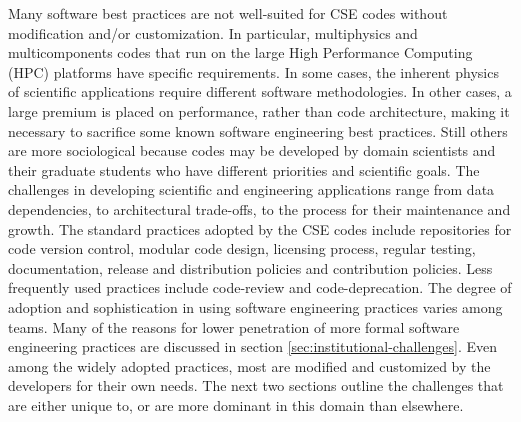 Many software best practices are not well-suited for CSE codes without
modification and/or customization.  In particular, multiphysics and
multicomponents codes that run on the large High Performance Computing
(HPC) platforms have specific requirements.  In some cases, the
inherent physics of scientific applications require different software
methodologies.  In other cases, a large premium is placed on
performance, rather than code architecture, making it necessary to
sacrifice some known software engineering best practices.  Still
others are more sociological because codes may be developed by domain
scientists and their graduate students who have different priorities
and scientific goals.  
The challenges in developing scientific and engineering applications range
from data dependencies, to architectural trade-offs, to the process for their maintenance and
growth. 
The standard practices adopted by the CSE codes include
repositories for code version control, modular code design, licensing
process, regular testing, documentation, release and distribution
policies and contribution policies. Less frequently used practices
include code-review and code-deprecation. 
The degree of adoption and
sophistication in using software engineering practices varies among teams. Many of
the reasons for lower penetration of more formal software engineering practices are discussed in section
\ref{sec:institutional-challenges}. Even among the widely adopted
practices, most are modified and customized by the developers for
their own needs. The next two sections outline the challenges that
are either unique to, or are more dominant in this domain than
elsewhere.  


